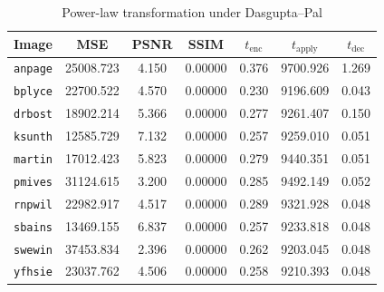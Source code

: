 \begin{table}[h]
	\caption{Power-law transformation under Dasgupta--Pal}
	\label{tbl:pwr-dp}
    \begin{tabular}{lcccccc}
        \toprule
        Image & MSE  & PSNR & SSIM & $t_\text{enc}$ & $t_\text{apply}$ & $t_\text{dec}$ \\ \midrule
		\texttt{anpage} & 25008.723 & 4.150 & 0.00000 & 0.376 & 9700.926 & 1.269 \\
		\texttt{bplyce} & 22700.522 & 4.570 & 0.00000 & 0.230 & 9196.609 & 0.043 \\
		\texttt{drbost} & 18902.214 & 5.366 & 0.00000 & 0.277 & 9261.407 & 0.150 \\
		\texttt{ksunth} & 12585.729 & 7.132 & 0.00000 & 0.257 & 9259.010 & 0.051 \\
		\texttt{martin} & 17012.423 & 5.823 & 0.00000 & 0.279 & 9440.351 & 0.051 \\
		\texttt{pmives} & 31124.615 & 3.200 & 0.00000 & 0.285 & 9492.149 & 0.052 \\
		\texttt{rnpwil} & 22982.917 & 4.517 & 0.00000 & 0.289 & 9321.928 & 0.048 \\
		\texttt{sbains} & 13469.155 & 6.837 & 0.00000 & 0.257 & 9233.818 & 0.048 \\
		\texttt{swewin} & 37453.834 & 2.396 & 0.00000 & 0.262 & 9203.045 & 0.048 \\
		\texttt{yfhsie} & 23037.762 & 4.506 & 0.00000 & 0.258 & 9210.393 & 0.048 \\
		\bottomrule
        \end{tabular}
\end{table}


